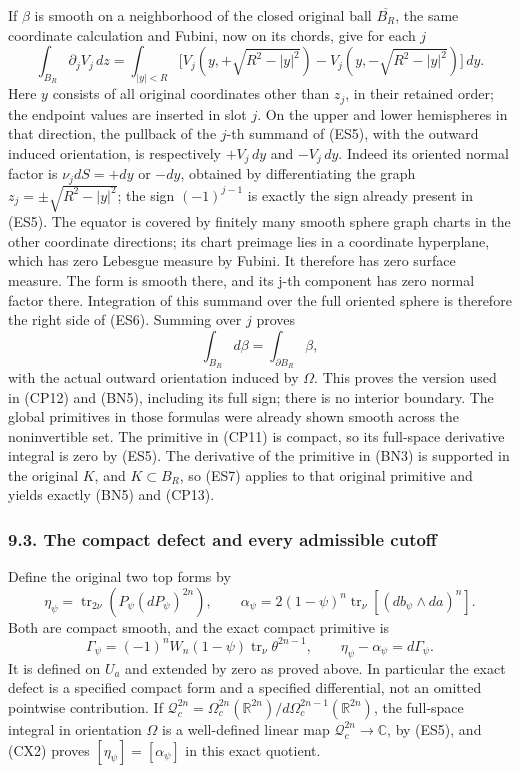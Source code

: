 \documentclass[
  11pt,
]{article}
\begin{document}
If \(\beta\) is smooth on a neighborhood of the closed original ball
\(\overline{B_R}\), the same coordinate calculation and Fubini, now on
its chords, give for each \(j\) \[
 \int_{B_R}\partial_jV_j\,dz
 =\int_{|y|<R}
    \bigl[V_j(y,+\sqrt{R^2-|y|^2})
          -V_j(y,-\sqrt{R^2-|y|^2})\bigr]\,dy.
 \tag{ES6}
\] Here \(y\) consists of all original coordinates other than \(z_j\),
in their retained order; the endpoint values are inserted in slot \(j\).
On the upper and lower hemispheres in that direction, the pullback of
the \(j\)-th summand of (ES5), with the outward induced orientation, is
respectively \(+V_j\,dy\) and \(-V_j\,dy\). Indeed its oriented normal
factor is \(\nu_jdS=+dy\) or \(-dy\), obtained by differentiating the
graph \(z_j=\pm\sqrt{R^2-|y|^2}\); the sign \((-1)^{j-1}\) is exactly
the sign already present in (ES5). The equator is covered by finitely
many smooth sphere graph charts in the other coordinate directions; its
chart preimage lies in a coordinate hyperplane, which has zero Lebesgue
measure by Fubini. It therefore has zero surface measure. The form is
smooth there, and its j-th component has zero normal factor there.
Integration of this summand over the full oriented sphere is therefore
the right side of (ES6). Summing over \(j\) proves \[
 \int_{B_R}d\beta=\int_{\partial B_R}\beta,
 \tag{ES7}
\] with the actual outward orientation induced by \(\Omega\). This
proves the version used in (CP12) and (BN5), including its full sign;
there is no interior boundary. The global primitives in those formulas
were already shown smooth across the noninvertible set. The primitive in
(CP11) is compact, so its full-space derivative integral is zero by
(ES5). The derivative of the primitive in (BN3) is supported in the
original \(K\), and \(K\subset B_R\), so (ES7) applies to that original
primitive and yields exactly (BN5) and (CP13).

\subsubsection{9.3. The compact defect and every admissible
cutoff}\label{the-compact-defect-and-every-admissible-cutoff}

Define the original two top forms by \[
 \eta_\psi=\operatorname{tr}_{2\nu}(P_\psi(dP_\psi)^{2n}),
 \qquad
 \alpha_\psi=2(1-\psi)^n
                   \operatorname{tr}_\nu[(db_\psi\wedge da)^n].
 \tag{CX1}
\] Both are compact smooth, and the exact compact primitive is \[
 \Gamma_\psi=(-1)^n W_n(1-\psi)
                    \operatorname{tr}_\nu\theta^{2n-1},
 \qquad \eta_\psi-\alpha_\psi=d\Gamma_\psi.
 \tag{CX2}
\] It is defined on \(U_a\) and extended by zero as proved above. In
particular the exact defect is a specified compact form and a specified
differential, not an omitted pointwise contribution. If
\(\mathcal Q_c^{2n}=\Omega_c^{2n}(\mathbb R^{2n})/d\Omega_c^{2n-1}(\mathbb R^{2n})\),
the full-space integral in orientation \(\Omega\) is a well-defined
linear map \(\mathcal Q_c^{2n}\to\mathbb C\), by (ES5), and (CX2) proves
\([\eta_\psi]=[\alpha_\psi]\) in this exact quotient.
\end{document}
